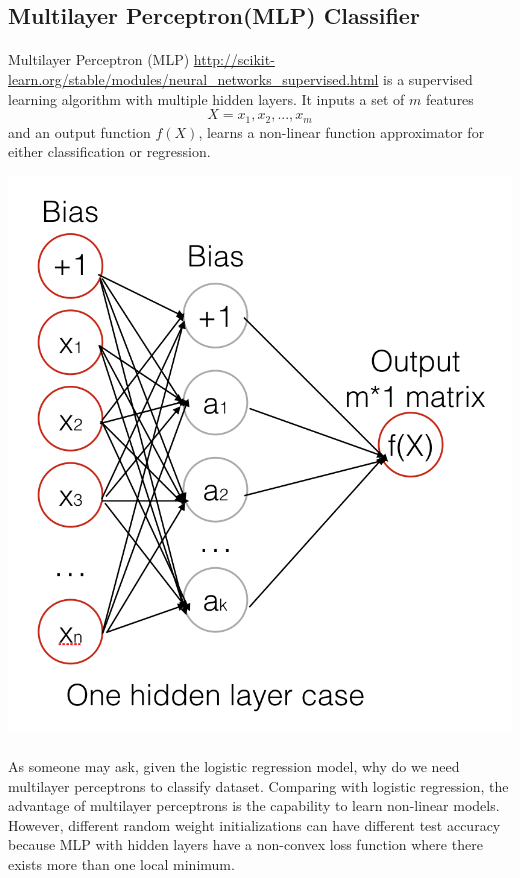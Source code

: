 \documentclass{article}
\begin{document}
\subsection{Multilayer Perceptron(MLP) Classifier}
\paragraph{}
Multilayer Perceptron (MLP) \url{http://scikit-learn.org/stable/modules/neural_networks_supervised.html} is a supervised learning algorithm with multiple hidden layers. It inputs a set of $m$ features \[
X = x_1, x_2, ... , x_m\] and an output function $f(X)$, learns a non-linear function approximator for either classification or regression.

\begin{center}
\includegraphics[scale=0.3]{2.png}
\end{center}
\paragraph{}
As someone may ask, given the logistic regression model, why do we need multilayer perceptrons to classify dataset. Comparing with logistic regression, the advantage of multilayer perceptrons is the capability to learn non-linear models. However, different random weight initializations can have different test accuracy because MLP with hidden layers have a non-convex loss function where there exists more than one local minimum. 
\end{document}

